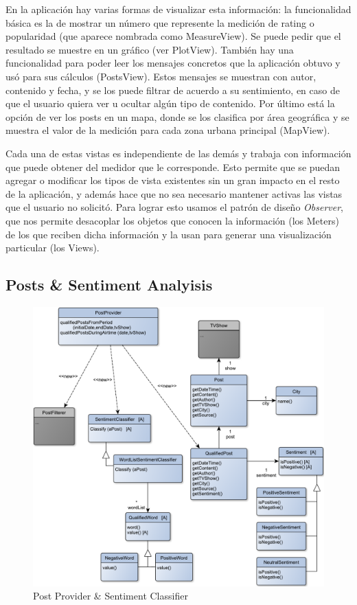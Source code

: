 En la aplicación hay varias formas de visualizar esta información: la funcionalidad básica es la de mostrar un número que represente la medición de rating o popularidad (que aparece nombrada como MeasureView). Se puede pedir que el resultado se muestre en un gráfico (ver PlotView). También hay una funcionalidad para poder leer los mensajes concretos que la aplicación obtuvo y usó para sus cálculos (PostsView). Estos mensajes se muestran con autor, contenido y fecha, y se los puede filtrar de acuerdo a su sentimiento, en caso de que el usuario quiera ver u ocultar algún tipo de contenido. Por último está la opción de ver los posts en un mapa, donde se los clasifica por área geográfica y se muestra el valor de la medición para cada zona urbana principal (MapView).
\bigskip

Cada una de estas vistas es independiente de las demás y trabaja con información que puede obtener del medidor que le corresponde. Esto permite que se puedan agregar o modificar los tipos de vista existentes sin un gran impacto en el resto de la aplicación, y además hace que no sea necesario mantener activas las vistas que el usuario no solicitó. Para lograr esto usamos el patrón de diseño \textit{Observer}, que nos permite desacoplar los objetos que conocen la información (los Meters) de los que reciben dicha información y la usan para generar una visualización particular (los Views).

\subsection{Posts \& Sentiment Analyisis}

\begin{figure}[H]
\centering
\includegraphics[width=\textwidth]{graph/clase/classifier.pdf}
\caption{Post Provider \& Sentiment Classifier}
\end{figure}

